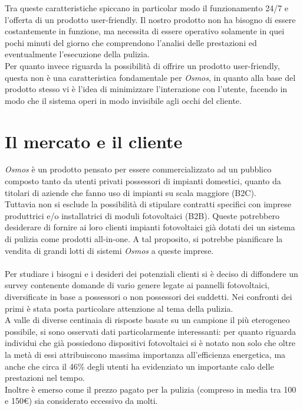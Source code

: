 \documentclass[a4paper, 12pt]{article}
\begin{document}
	Tra queste caratteristiche spiccano in particolar modo il funzionamento 24/7 e l'offerta di un prodotto user-friendly. Il nostro prodotto non ha bisogno di essere costantemente in funzione, ma necessita di essere operativo solamente in quei pochi minuti del giorno che comprendono l'analisi delle prestazioni ed eventualmente l'esecuzione della pulizia.\\
	Per quanto invece riguarda la possibilità di offrire un prodotto user-friendly, questa non è una caratteristica fondamentale per \emph{Osmos}, in quanto alla base del prodotto stesso vi è l'idea di minimizzare l'interazione con l'utente, facendo in modo che il sistema operi in modo invisibile agli occhi del cliente.
	\section{Il mercato e il cliente}
	\emph{Osmos} è un prodotto pensato per essere commercializzato ad un pubblico composto tanto da utenti privati possessori di impianti domestici, quanto da titolari di aziende che fanno uso di impianti su scala maggiore (B2C).\\
	Tuttavia non si esclude la possibilità di stipulare contratti specifici con imprese produttrici e/o installatrici di moduli fotovoltaici (B2B). Queste potrebbero desiderare di fornire ai loro clienti impianti fotovoltaici già dotati dei un sistema di pulizia come prodotti all-in-one. A tal proposito, si potrebbe pianificare la vendita di grandi lotti di sistemi \emph{Osmos} a queste imprese.\\\\
	Per studiare i bisogni e i desideri dei potenziali clienti si è deciso di diffondere un survey contenente domande di vario genere legate ai pannelli fotovoltaici, diversificate in base a possessori o non possessori dei suddetti. Nei confronti dei primi è stata posta particolare attenzione al tema della pulizia.\\
	A valle di diverse centinaia di risposte basate su un campione il più eterogeneo possibile, si sono osservati dati particolarmente interessanti: per quanto riguarda individui che già possiedono dispositivi fotovoltaici si è notato non solo che oltre la metà di essi attribuiscono massima importanza all'efficienza energetica, ma anche che circa il 46\% degli utenti ha evidenziato un importante calo delle prestazioni nel tempo.\\
	Inoltre è emerso come il prezzo pagato per la pulizia (compreso in media tra 100 e 150\euro) sia considerato eccessivo da molti.
\end{document}
